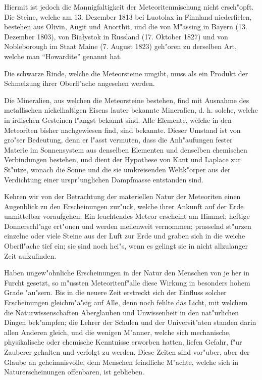 \documentclass[a4paper, 11pt, oneside, german]{article}
\begin{document}
Hiermit ist jedoch die Mannigfaltigkeit der Meteoritenmischung nicht ersch"opft. Die Steine, welche am 13. Dezember 1813 bei Luotolax in Finnland niederfielen, bestehen aus Olivin, Augit und Anorthit, und die von M"assing in Bayern (13. Dezember 1803), von Białystok in Russland (17. Oktober 1827) und von Nobleborough im Staat Maine (7. August 1823) geh"oren zu derselben Art, welche man "`Howardite"' genannt hat.

Die schwarze Rinde, welche die Meteorsteine umgibt, muss als ein Produkt der Schmelzung ihrer Oberfl"ache angesehen werden.

Die Mineralien, aus welchen die Meteorsteine bestehen, find mit Ausnahme des metallischen nickelhaltigen Eisens lauter bekannte Mineralien, d. h. solche, welche in irdischen Gesteinen l"angst bekannt sind. Alle Elemente, welche in den Meteoriten bisher nachgewiesen find, sind bekannte. Dieser Umstand ist von gro"ser Bedeutung, denn er l"asst vermuten, dass die Anh"aufungen fester Materie im Sonnensystem aus denselben Elementen und denselben chemischen Verbindungen bestehen, und dient der Hypothese von Kant und Laplace zur St"utze, wonach die Sonne und die sie umkreisenden Weltk"orper aus der Verdichtung einer urspr"unglichen Dampfmasse entstanden sind.

Kehren wir von der Betrachtung der materiellen Natur der Meteoriten einen Augenblick zu den Erscheinungen zur"uck, welche ihrer Ankunft auf der Erde unmittelbar voraufgehen. Ein leuchtendes Meteor erscheint am Himmel; heftige Donnerschl"age ert"onen und werden meilenweit vernommen; prasselnd st"urzen einzelne oder viele Steine aus der Luft zur Erde und graben sich in die weiche Oberfl"ache tief ein; sie sind noch hei"s, wenn es gelingt sie in nicht allzulanger Zeit aufzufinden.

Haben ungew"ohnliche Erscheinungen in der Natur den Menschen von je her in Furcht gesetzt, so m"ussten Meteoritenf"alle diese Wirkung in besonders hohem Grade "au"sern. Bis in die neuere Zeit erstreckt sich der Einfluss solcher Erscheinungen gleichm"a"sig auf Alle, denn noch fehlte das Licht, mit welchem die Naturwissenschaften Aberglauben und Unwissenheit in den nat"urlichen Dingen bek"ampfen; die Lehrer der Schulen und der Universit"aten standen darin allen Anderen gleich, und die wenigen M"anner, welche sich mechanische, physikalische oder chemische Kenntnisse erworben hatten, liefen Gefahr, f"ur Zauberer gehalten und verfolgt zu werden. Diese Zeiten sind vor"uber, aber der Glaube an geheimnisvolle, dem Menschen feindliche M"achte, welche sich in Naturerscheinungen offenbaren, ist geblieben.
\end{document}
